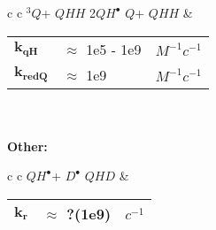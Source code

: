 \documentclass{article}
\def\QH{$QH^{\bullet }$}
\def\D{$D^{\bullet }$}
\def\Q{$Q$}
\def\Qt{$^{3}Q$}
\def\QHH{$QHH$}
\def\QHD{$QHD$}
\begin{document}
\begin{tabular}{ c c }
    \schemestart
    \Qt + \QHH
    \arrow{->[$k_{qH}$]}
    2\QH
    \arrow{->[$k_{redQ}$]}
    \Q + \QHH
    \schemestop
     & \begin{tabular}{ l l l }
           $\mathbf{k_{qH}}$            & $\approx$ 1e5 - 1e9 & $M^{-1}c^{-1}$ \\
           $\mathbf{\mathbf{k_{redQ}}}$ & $\approx$ 1e9       & $M^{-1}c^{-1}$ \\\hline
       \end{tabular}
    \vspace{1.5mm}
\end{tabular}
\vspace{1.5mm}
\\
\\
\textbf{Other:}

\begin{tabular}{ c c }
    \schemestart
    \QH + \D
    \arrow{->[$k_{r}$]}
    \QHD
    \schemestop
     & \begin{tabular}{ l l l }
           $\mathbf{k_{r}}$ & $\approx$ ?(1e9) & $c^{-1}$ \\\hline
       \end{tabular}
    \vspace{1.5mm}
\end{tabular}
\vspace{1.5mm}
\end{document}
